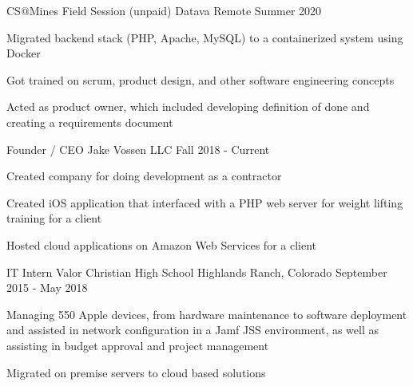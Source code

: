 \begin{cventries}
      \ifcv
    \cventry
    {CS@Mines Field Session (unpaid)}
    {Datava}
    {Remote}
    {Summer 2020}
    {
      \begin{cvitems}
        \item Migrated backend stack (PHP, Apache, MySQL) to a containerized system using Docker
        \item Got trained on scrum, product design, and other software engineering concepts
        \item Acted as product owner, which included developing definition of done and creating a requirements document
      \end{cvitems}
    }

    \cventry
    {Founder / CEO}
    { Jake Vossen LLC }
    {}
    {Fall 2018 - Current}
    {
      \begin{cvitems}
        \item {Created company for doing development as a contractor}
        \item {Created iOS application that interfaced with a PHP web server for weight lifting training for a client}
        \item {Hosted cloud applications on Amazon Web Services for a client}
      \end{cvitems}
    }
    

  \cventry
    {IT Intern}
    {Valor Christian High School }
    {Highlands Ranch, Colorado} %
    {September 2015 - May 2018} %
    {
      \begin{cvitems} %
        \item {Managing 550 Apple devices, from hardware maintenance
            to software deployment and assisted in network
            configuration in a Jamf JSS environment, as well as
            assisting in budget approval and project management}
        \item {Migrated on premise servers to cloud based solutions}
      \end{cvitems}
    }
    \fi
\end{cventries}
